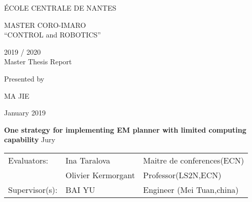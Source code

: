 
\thispagestyle{empty}

\def\lskip{\vspace{0.5cm}}

\begin{center}
ÉCOLE CENTRALE DE NANTES
\end{center}

\vspace{2cm}

\begin{center} \large\sc MASTER CORO-IMARO\\ \normalsize{``CONTROL and ROBOTICS''} 
\end{center}

\begin{center}
	2019 / 2020\\
	\lskip
	Master Thesis Report
	\lskip
	
	Presented by \lskip 
	
	MA JIE \lskip
	
	January 2019 \lskip\lskip
	
	{\Large \textbf{One strategy for implementing EM planner with limited computing capability}}
	\vfill
Jury \lskip
		
	\end{center}
	


\begin{tabular}{p{3cm}p{7cm}p{5cm} }
 Evaluators: & Ina Taralova & Maitre de conferences(ECN) \\
	      & Olivier Kermorgant & Professor(LS2N,ECN) \\ 
  Supervisor(s):  & BAI YU & Engineer (Mei Tuan,china) \\		  
\end{tabular}

\lskip

\newpage
\addtocounter{page}{-1}
